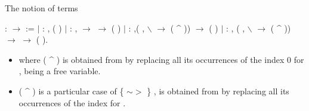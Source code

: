 \documentclass[10pt]{beamer}
\begin{document}
\begin{frame}[fragile]{The notion of terms}

  \begin{coqdoccode}
    \coqdocemptyline \coqdocnoindent {}
     :  \ensuremath{\rightarrow}
     :=\coqdoceol \coqdocindent{1.00em} \ensuremath{|}
     : \coqdockw{\ensuremath{\forall}}
    ,  (
    )\coqdoceol \coqdocindent{1.00em} \ensuremath{|}
     : \coqdockw{\ensuremath{\forall}}
     , 
    \ensuremath{\rightarrow}  
    \ensuremath{\rightarrow} \coqdoceol \coqdocindent{9.00em}
     ( 
    )\coqdoceol \coqdocindent{1.00em} \ensuremath{|}
     : \coqdockw{\ensuremath{\forall}}
     ,(\coqdockw{\ensuremath{\forall}}
    ,  $\backslash$
     \ensuremath{\rightarrow} 
    ( \^{} ))
    \ensuremath{\rightarrow}\coqdoceol \coqdocindent{18.00em}
     ( )\coqdoceol
    \coqdocindent{1.00em} \ensuremath{|}  :
    \coqdockw{\ensuremath{\forall}}  
    , (\coqdockw{\ensuremath{\forall}} ,
     $\backslash$ 
    \ensuremath{\rightarrow}  ( \^{}
    )) \ensuremath{\rightarrow}\coqdoceol
    \coqdocindent{12.00em}  
    \ensuremath{\rightarrow}  (
     ).\coqdoceol
  \end{coqdoccode}

  \begin{itemize}
  \item where ( \^{} ) is obtained from
     by replacing all its occurrences of the index 0 for
    ,  being a free variable.
  \item   ( \^{} ) is a particular case of 
     \{ \ensuremath{\sim}\ensuremath{>} \} , 
      is obtained from  by replacing all its occurrences of the index 
       for .
  \end{itemize}
\end{frame}
\end{document}
